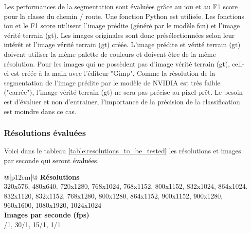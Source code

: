 \par Les performances de la segmentation sont évaluées grâce au \acrshort{iou} et au F1 score pour la classe du chemin / route. Une fonction Python est utilisée. Les fonctions \acrshort{iou} et le F1 score utilisent l'image prédite (généré par le modèle \acrshort{fcn}) et l'image vérité terrain (\acrshort{gt}). Les images originales sont donc présélectionnées selon leur intérêt et l'image vérité terrain (\acrshort{gt}) créée. L'image prédite et vérité terrain (\acrshort{gt}) doivent utiliser la même palette de couleurs et doivent être de la même résolution. Pour les images qui ne possèdent pas d'image vérité terrain (\acrshort{gt}), cell-ci est créée à la main avec l'éditeur "Gimp". Comme la résolution de la segmentation de l'image prédite par le modèle de NVIDIA est très faible ("carrée"), l'image vérité terrain (\acrshort{gt}) ne sera pas précise au pixel prêt. Le besoin est d'évaluer et non d'entrainer, l'importance de la précision de la classification est moindre dans ce cas. 
\subsubsection{Résolutions évaluées}\label{section:resolutions_to_be_tested}
Voici dans le tableau \ref{table:resolutions_to_be_tested} les résolutions et images par seconde qui seront évaluées. 
{
    \renewcommand*{\arraystretch}{1.4}
    \begin{table}[ht]
    \centering
    \caption{Résolutions et images par seconde (\acrshort{fps}) qui seront évaluées}\label{table:resolutions_to_be_tested}
    \vspace{0.1em} %
    \begin{tabular}{{@{}|p{12cm}|@{}}}
         \hline
         \textbf{Résolutions}\\
         \hline
        320x576, 480x640, 720x1280, 768x1024, 768x1152, 800x1152, 832x1024, 864x1024, 832x1120, 832x1152, 768x1280, 800x1280, 864x1152, 900x1152, 900x1280, 960x1600, 1080x1920, 1024x1024\\
        \hline
        \textbf{Images par seconde (\acrshort{fps}) }\\
        /1, 30/1, 15/1, 1/1\\
        \hline
    \end{tabular}
    \end{table}
}
